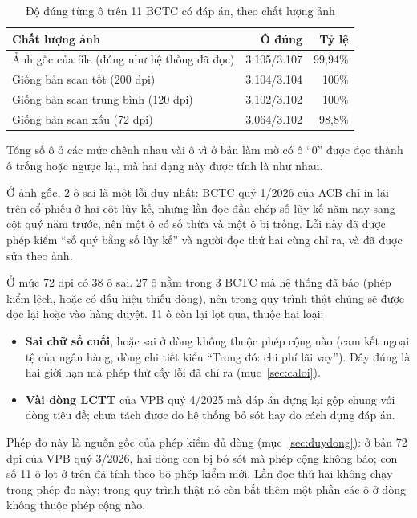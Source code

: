 \documentclass[12pt,a4paper]{report}
\newcommand{\enquote}[1]{“#1”}
\begin{document}
\begin{table}[H]
\centering\small
\caption{Độ đúng từng ô trên 11 BCTC có đáp án, theo chất lượng ảnh}\label{tab:dapan}
\begin{tabularx}{\linewidth}{@{}Xrr@{}}
\toprule
\textbf{Chất lượng ảnh} & \textbf{Ô đúng} & \textbf{Tỷ lệ} \\ \midrule
Ảnh gốc của file (đúng như hệ thống đã đọc) & 3.105/3.107 & 99,94\% \\
Giống bản scan tốt (200 dpi) & 3.104/3.104 & 100\% \\
Giống bản scan trung bình (120 dpi) & 3.102/3.102 & 100\% \\
Giống bản scan xấu (72 dpi) & 3.064/3.102 & 98,8\% \\
\bottomrule
\end{tabularx}
\end{table}

Tổng số ô ở các mức chênh nhau vài ô vì ở bản làm mờ có ô \enquote{0} được đọc thành ô trống hoặc ngược lại, mà hai
dạng này được tính là như nhau.

Ở ảnh gốc, 2 ô sai là một lỗi duy nhất: BCTC quý 1/2026 của ACB chỉ in lãi trên cổ phiếu ở hai cột lũy kế, nhưng lần
đọc đầu chép số lũy kế năm nay sang cột quý năm trước, nên một ô có số thừa và một ô bị trống. Lỗi này đã được phép
kiểm \enquote{số quý bằng số lũy kế} và người đọc thứ hai cùng chỉ ra, và đã được sửa theo ảnh.

Ở mức 72 dpi có 38 ô sai. 27 ô nằm trong 3 BCTC mà hệ thống đã báo (phép kiểm lệch, hoặc có dấu hiệu thiếu dòng), nên
trong quy trình thật chúng sẽ được đọc lại hoặc vào hàng duyệt. 11 ô còn lại lọt qua, thuộc hai loại:
\begin{itemize}
  \item \textbf{Sai chữ số cuối}, hoặc sai ở dòng không thuộc phép cộng nào (cam kết ngoại tệ của ngân hàng, dòng chi
        tiết kiểu \enquote{Trong đó: chi phí lãi vay}). Đây đúng là hai giới hạn mà phép thử cấy lỗi đã chỉ ra (mục~\ref{sec:caloi}).
  \item \textbf{Vài dòng LCTT} của VPB quý 4/2025 mà đáp án dựng lại gộp chung với dòng tiêu đề; chưa tách được do hệ
        thống bỏ sót hay do cách dựng đáp án.
\end{itemize}
Phép đo này là nguồn gốc của phép kiểm đủ dòng (mục~\ref{sec:duydong}): ở bản 72 dpi của VPB quý 3/2026, hai dòng con
bị bỏ sót mà phép cộng không báo; con số 11 ô lọt ở trên đã tính theo bộ phép kiểm mới. Lần đọc thứ hai không chạy
trong phép đo này; trong quy trình thật nó còn bắt thêm một phần các ô ở dòng không thuộc phép cộng nào.
\end{document}
